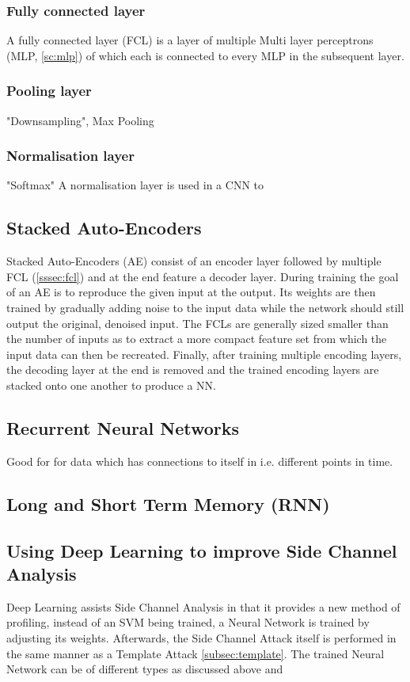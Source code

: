 \documentclass[journal]{IEEEtran}
\begin{document}
\subsubsection{Fully connected layer}
\label{sssec:fcl}
A fully connected layer (FCL) is a layer of multiple Multi layer perceptrons (MLP, \autoref{sc:mlp}) of which each is connected to every MLP in the subsequent layer. 

\subsubsection{Pooling layer}
"Downsampling", Max Pooling
\subsubsection{Normalisation layer}
"Softmax" A normalisation layer is used in a CNN to 

\subsection{Stacked Auto-Encoders}
Stacked Auto-Encoders (AE) consist of an encoder layer followed by multiple FCL (\autoref{sssec:fcl}) and at the end feature a decoder layer. During training the goal of an AE is to reproduce the given input at the output. Its weights are then trained by gradually adding noise to the input data while the network should still output the original, denoised input. The FCLs are generally sized smaller than the number of inputs as to extract a more compact feature set from which the input data can then be recreated. Finally, after training multiple encoding layers, the decoding layer at the end is removed and the trained encoding layers are stacked onto one another to produce a NN. %

\subsection{Recurrent Neural Networks}
Good for for data which has connections to itself in i.e. different points in time.
\subsection{Long and Short Term Memory (RNN)}

\subsection{Using Deep Learning to improve Side Channel Analysis}
Deep Learning assists Side Channel Analysis in that it provides a new method of profiling, instead of an SVM being trained, a Neural Network is trained by adjusting its weights. Afterwards, the Side Channel Attack itself is performed in the same manner as a Template Attack \autoref{subsec:template}. The trained Neural Network can be of different types as discussed above and 
\end{document}
